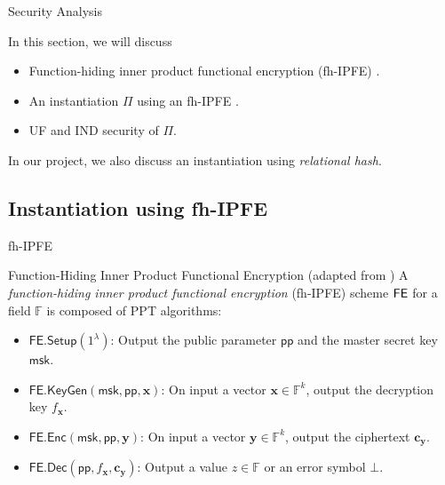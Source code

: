 
\begin{frame}{Security Analysis}

In this section, we will discuss

\begin{itemize}

	\item Function-hiding inner product functional encryption (fh-IPFE) \cite{cryptoeprint:2016/440}.

	\item An instantiation $\Pi$ using an fh-IPFE \cite{cryptoeprint:2023/481}.

	\item UF and IND security of $\Pi$.

\end{itemize}

In our project, we also discuss an instantiation using \emph{relational hash}.

\end{frame}


\subsection{Instantiation using fh-IPFE}


\begin{frame}{fh-IPFE}

\begin{definition}{Function-Hiding Inner Product Functional Encryption (adapted from \cite{cryptoeprint:2016/440})}
	A \emph{function-hiding inner product functional encryption} (fh-IPFE) scheme $\sf FE$ for a field $\mathbb{F}$ is composed of PPT algorithms:
	\begin{itemize}
	
		\item<2-> $\textsf{FE.Setup}(1^\lambda)$: Output the public parameter $\textsf{pp}$ and the master secret key $\textsf{msk}$.
	
		\item<3-> $\textsf{FE.KeyGen}(\textsf{msk}, \textsf{pp}, \mathbf{x})$: On input a vector $\mathbf{x} \in \mathbb{F}^k$, output the decryption key $f_\mathbf{x}$.  
	
		\item<4-> $\textsf{FE.Enc}(\textsf{msk}, \textsf{pp}, \mathbf{y})$: On input a vector $\mathbf{y} \in \mathbb{F}^k$, output the ciphertext $\mathbf{c_y}$. 
	
		\item<5-> $\textsf{FE.Dec}(\textsf{pp}, f_\mathbf{x}, \mathbf{c_y})$: Output a value $z \in \mathbb{F}$ or an error symbol $\bot$.
	
	\end{itemize}
	

\end{definition}

\end{frame}


